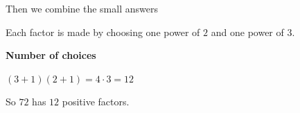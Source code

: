 \documentclass[aspectratio=169,11pt]{beamer}
\newcommand{\CardTitleSize}{\large}
\newcommand{\CardTitle}[1]{%
  \vspace{0.15cm}
  {\CardTitleSize\bfseries #1}\par
}
\begin{document}
\begin{frame}{Then we combine the small answers}

\begin{OrangeBox}[
  calloutshadedorange,
  fontupper=\large,
  halign=center
]{}
Each factor is made by choosing one power of \(2\) and one power of \(3\).
\end{OrangeBox}

\vspace{0.12cm}

\begin{center}
\begin{GreenCard}[
  width=0.88\textwidth,
  halign=center,
  top=14pt,
  bottom=14pt
]
\CardTitle{Number of choices}

\vspace{0.10cm}

{\Huge
\(\displaystyle (3+1)(2+1)=4\cdot3=12\)\par

}

\vspace{0.10cm}

\begin{BlueBox}[
  calloutshadedblue,
  halign=center,
  fontupper=\Large
]{}
So \(72\) has \(12\) positive factors.
\end{BlueBox}

\end{GreenCard}
\end{center}



\end{frame}
\end{document}
